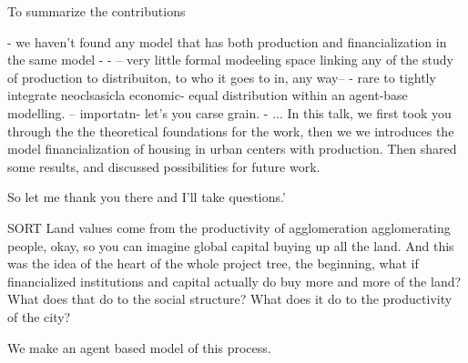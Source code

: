 \documentclass[]{article}
\begin{document}
To summarize the contributions

- we haven't found any model that has both production and financialization in the same model - 
- -- very little formal modeeling space linking any of the study of production to distribuiton, to who it goes to in, any way-- 
- rare to tightly integrate neoclsasicla economic- equal distribution within an agent-base modelling. -- importatn- let's you carse grain.
- ...
In this talk, we first took you through the the theoretical foundations for the work, then we we introduces the model financialization of housing in urban centers with production. Then shared some results, and  discussed possibilities for future work. 

So let me thank you there and I'll take questions.'



SORT 
Land values come from the productivity of agglomeration agglomerating people, okay, so you can imagine global capital buying up all the land.
And this was the idea of the heart of the whole project tree, the beginning, what if financialized institutions and capital actually do buy more and more of the land? What does that do to the social structure? What does it do to the productivity of the city?

We make an agent based model of this process. 
\end{document}
